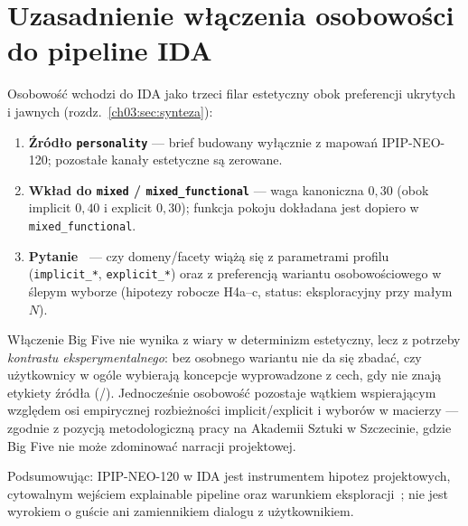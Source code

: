 \section{Uzasadnienie włączenia osobowości do pipeline IDA}
\label{ch05:sec:uzasadnienie}

Osobowość wchodzi do IDA jako trzeci filar estetyczny obok preferencji ukrytych i jawnych (rozdz.~\ref{ch03:sec:synteza}):
\begin{enumerate}
  \item \textbf{Źródło \texttt{personality}} --- brief budowany wyłącznie z mapowań IPIP-NEO-120; pozostałe kanały estetyczne są zerowane.
  \item \textbf{Wkład do \texttt{mixed} / \texttt{mixed\_functional}} --- waga kanoniczna $0{,}30$ (obok implicit $0{,}40$ i explicit $0{,}30$); funkcja pokoju dokładana jest dopiero w \texttt{mixed\_functional}.
  \item \textbf{Pytanie~} --- czy domeny/facety wiążą się z parametrami profilu (\texttt{implicit\_*}, \texttt{explicit\_*}) oraz z preferencją wariantu osobowościowego w ślepym wyborze (hipotezy robocze H4a--c, status: eksploracyjny przy małym~$N$).
\end{enumerate}

Włączenie Big Five nie wynika z wiary w determinizm estetyczny, lecz z potrzeby \emph{kontrastu eksperymentalnego}: bez osobnego wariantu nie da się zbadać, czy użytkownicy w ogóle wybierają koncepcje wyprowadzone z cech, gdy nie znają etykiety źródła (/).
Jednocześnie osobowość pozostaje wątkiem wspierającym względem osi empirycznej rozbieżności implicit/explicit i wyborów w macierzy --- zgodnie z pozycją metodologiczną pracy na Akademii Sztuki w Szczecinie, gdzie Big Five nie może zdominować narracji projektowej.

Podsumowując: IPIP-NEO-120 w IDA jest instrumentem hipotez projektowych, cytowalnym wejściem explainable pipeline oraz warunkiem eksploracji~; nie jest wyrokiem o guście ani zamiennikiem dialogu z użytkownikiem.
